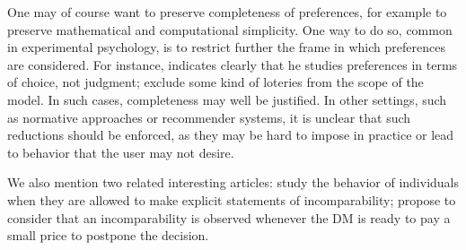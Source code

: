 \documentclass[french, english]{llncs}
\begin{document}
One may of course want to preserve completeness of preferences, for example to preserve mathematical and computational simplicity. One way to do so, common in experimental psychology, is to restrict further the frame in which preferences are considered. For instance, \citet{luce_utility_2000} indicates clearly that he studies preferences in terms of choice, not judgment; \citet{maccrimmon_real_1980} exclude some kind of loteries from the scope of the model. In such cases, completeness may well be justified. 
In other settings, such as normative approaches or recommender systems, it is unclear that such reductions should be enforced, as they may be hard to impose in practice or lead to behavior that the user may not desire. 
	
	
We also mention two related interesting articles: 
\citet{deparis_when_2012} study the behavior of individuals when they are allowed to make explicit statements of incomparability; \citet{danan_are_2006} propose to consider that an incomparability is observed whenever the \ac{DM} is ready to pay a small price to postpone the decision.
\end{document}
